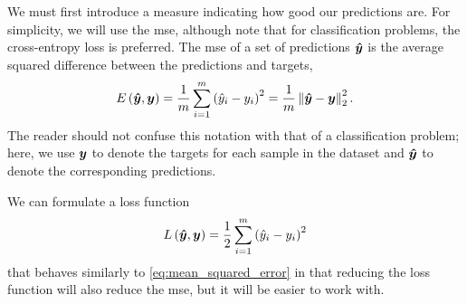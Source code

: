 \documentclass[../report.tex]{subfiles}
\begin{document}
We must first introduce a measure indicating how good our predictions are.
For simplicity, we will use the \gls{mse}, although note that for classification problems, the cross-entropy loss is preferred.
The \gls{mse} of a set of predictions ${\bm{\hat{y}}}$ is the average squared difference between the predictions and targets,
\begin{equation}
    \label{eq:mean_squared_error}
    E\left( {\bm{\hat{y}}}, {\bm{y}} \right) = \frac{1}{m} \sum_{i=1}^m{\left(\hat{y}_i - y_i\right)^2} = \frac{1}{m} \left\lVert{\bm{\hat{y}}}-{\bm{y}}\right\rVert_2^2.
\end{equation}
The reader should not confuse this notation with that of a classification problem; here, we use ${\bm{y}}$ to denote the targets for each sample in the dataset and ${\bm{\hat{y}}}$ to denote the corresponding predictions.

We can formulate a loss function
\begin{equation}
    \label{eq:mse}
    L\left( {\bm{\hat{y}}}, {\bm{y}} \right) = \frac{1}{2} \sum_{i=1}^m{\left(\hat{y}_i - y_i\right)^2}
\end{equation}
that behaves similarly to \cref{eq:mean_squared_error} in that reducing the loss function will also reduce the \gls{mse}, but it will be easier to work with.
\end{document}
